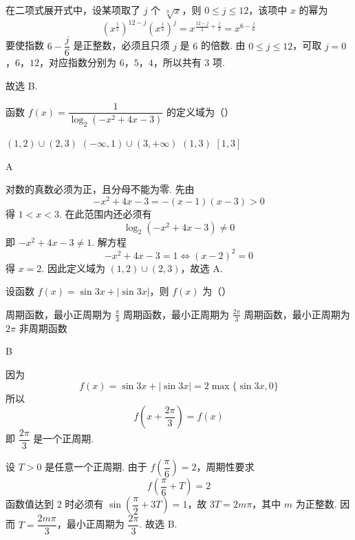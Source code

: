 \begin{solution}
在二项式展开式中，设某项取了 \(j\) 个 \(\sqrt[3]{x}\)，则 \(0\leqslant j\leqslant12\)，该项中 \(x\) 的幂为
\[
\left(x^{\frac{1}{2}}\right)^{12-j}\left(x^{\frac{1}{3}}\right)^j
=x^{\frac{12-j}{2}+\frac j3}
=x^{6-\frac j6}
\]
要使指数 \(6-\dfrac j6\) 是正整数，必须且只须 \(j\) 是 \(6\) 的倍数. 由 \(0\leqslant j\leqslant12\)，可取 \(j=0\)，\(6\)，\(12\)，对应指数分别为 \(6\)，\(5\)，\(4\)，所以共有 \(3\) 项.

故选 B.
\end{solution}

\begin{problem}
函数 \(f(x)=\dfrac{1}{\log_{2}(-x^{2}+4x-3)}\) 的定义域为（\quad）

\choices
    {\((1,2)\cup(2,3)\)}
    {\(\left(-\infty,1\right)\cup\left(3,+\infty\right)\)}
    {\((1,3)\)}
    {\([1,3]\)}
\end{problem}

\begin{answer}
A
\end{answer}

\begin{solution}
对数的真数必须为正，且分母不能为零. 先由
\[
-x^2+4x-3=-(x-1)(x-3)>0
\]
得 \(1<x<3\). 在此范围内还必须有
\[
\log_2(-x^2+4x-3)\neq0
\]
即 \(-x^2+4x-3\neq1\). 解方程
\[
-x^2+4x-3=1
\Longleftrightarrow (x-2)^2=0
\]
得 \(x=2\). 因此定义域为 \((1,2)\cup(2,3)\)，故选 A.
\end{solution}

\begin{problem}
设函数 \(f(x)=\sin3x+|\sin3x|\)，则 \(f(x)\) 为（\quad）

\choices
    {周期函数，最小正周期为 \(\frac{\pi}{3}\)}
    {周期函数，最小正周期为 \(\frac{2\pi}{3}\)}
    {周期函数，最小正周期为 \(2\pi\)}
    {非周期函数}
\end{problem}

\begin{answer}
B
\end{answer}

\begin{solution}
因为
\[
f(x)=\sin3x+|\sin3x|=2\max\{\sin3x,0\}
\]
所以
\[
f\left(x+\frac{2\pi}{3}\right)=f(x)
\]
即 \(\dfrac{2\pi}{3}\) 是一个正周期.

设 \(T>0\) 是任意一个正周期. 由于 \(f\left(\dfrac\pi6\right)=2\)，周期性要求
\[
f\left(\frac\pi6+T\right)=2
\]
函数值达到 \(2\) 时必须有 \(\sin\left(\dfrac\pi2+3T\right)=1\)，故 \(3T=2m\pi\)，其中 \(m\) 为正整数. 因而 \(T=\dfrac{2m\pi}{3}\)，最小正周期为 \(\dfrac{2\pi}{3}\). 故选 B.
\end{solution}

